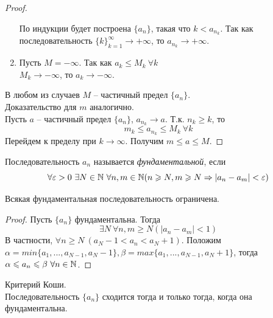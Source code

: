 \begin{proof}
\begin{enumerate}
            По индукции будет построена $\{a_{n}\}$, такая что $k < a_{n_{k}}$. Так как последовательность $\{k\}_{k = 1}^{\infty} \to +\infty$, то $a_{n_{k}} \to +\infty$.
            \item 
            Пусть $M = -\infty$. Так как $a_{k} \leq M_{k} \ \forall k$\\
            $M_{k} \to -\infty$, то $a_{k} \to -\infty$.
        \end{enumerate}
        В любом из случаев $M$ -- частичный предел $\{a_{n}\}$.\\
        Доказательство для $m$ аналогично.\\
        Пусть $a$ -- частичный предел $\{a_{n}\}$, $a_{n_{k}} \rightarrow a$. Т.к. $n_{k} \geq k$, то 
            \[m_{k} \leq a_{n_{k}} \leq M_{k} \  \forall k\]
            Перейдем к пределу при $k \rightarrow \infty$. Получим $m \leq a \leq M$.
    \end{proof}

    \begin{definition}
        Последовательность $a_{n}$ называется \textit{фундаментальной}, если
        \[\forall \epsilon > 0 \ \exists N \in \N \ \forall n, m \in \N (n \geq N, m \geq N \Rightarrow |a_{n} - a_{m}| < \epsilon)\]
    \end{definition}
    
    \begin{lemma}
        Всякая фундаментальная последовательность ограничена.
    \end{lemma}
    
    \begin{proof}
        Пусть $\{a_{n}\}$ фундаментальна. Тогда
        \[\exists N \ \forall n, m \geq N (|a_{n} - a_{m}| < 1)\]
        В частности, $\forall n \geq N \ (a_{N} - 1 < a_{n} < a_{N} + 1)$.
        Положим $\alpha = min\{a_{1}, ..., a_{N-1}, a_{N} - 1\}, \beta = max\{a_{1}, ..., a_{N-1}, a_{N} + 1\}$, тогда $\alpha \leqslant a_n \leqslant \beta \ \forall n \in \mathbb{N}$.
    \end{proof}
    
    \begin{theorem}{Критерий Коши.}\\
     Последовательность $\{a_{n}\}$ сходится тогда и только тогда, когда она фундаментальна.
    \end{theorem}
    
